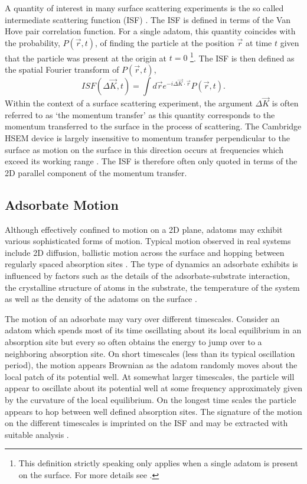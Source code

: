 A quantity of interest in many surface scattering experiments is the so called intermediate scattering function (ISF) \cite{HSEM, JARDINE2009323, Ward}. The ISF is defined in terms of the Van Hove pair correlation function. For a single adatom, this quantity coincides with the probability, $P(\vec{r}, t)$, of finding the particle at the position $\vec{r}$ at time $t$ given that the particle was present at the origin at $t=0$ \cite{vanhove} \footnote{This definition strictly speaking only applies when a single adatom is present on the surface. For more details see \cite{vanhove}.}. The ISF is then defined as the spatial Fourier transform of $P\left(\vec{r}, t\right)$,
\begin{equation}
	ISF\left(\Delta{\vec{K}}, t\right) = \int d\vec{r} e^{-i\Delta{\vec{K}}\cdot\vec{r}} P\left(\vec{r}, t\right).
\end{equation}
Within the context of a surface scattering experiment, the argument $\Delta{\vec{K}}$ is often referred to as `the momentum transfer' as this quantity corresponds to the momentum transferred to the surface in the process of scattering. The Cambridge HSEM device is largely insensitive to momentum transfer perpendicular to the surface as motion on the surface in this direction occurs at frequencies which exceed its working range \cite{HSEM}. The ISF is therefore often only quoted in terms of the 2D parallel component of the momentum transfer. 

\subsection{Adsorbate Motion}

Although effectively confined to motion on a 2D plane, adatoms may exhibit various sophisticated forms of motion. Typical motion observed in real systems include 2D diffusion, ballistic motion across the surface and hopping between regularly spaced absorption sites \cite{Ward, Townsend}. The type of dynamics an adsorbate exhibits is influenced by factors such as the details of the adsorbate-substrate interaction, the crystalline structure of atoms in the substrate, the temperature of the system as well as the density of the adatoms on the surface \cite{Ward, Townsend}. 

The motion of an adsorbate may vary over different timescales. Consider an adatom which spends most of its time oscillating about its local equilibrium in an absorption site but every so often obtains the energy to jump over to a neighboring absorption site. On short timescales (less than its typical oscillation period), the motion appears Brownian as the adatom randomly moves about the local patch of its potential well. At somewhat larger timescales, the particle will appear to oscillate about its potential well at some frequency approximately given by the curvature of the local equilibrium. On the longest time scales the particle appears to hop between well defined absorption sites. The signature of the motion on the different timescales is imprinted on the ISF and may be extracted with suitable analysis \cite{Ward}.

